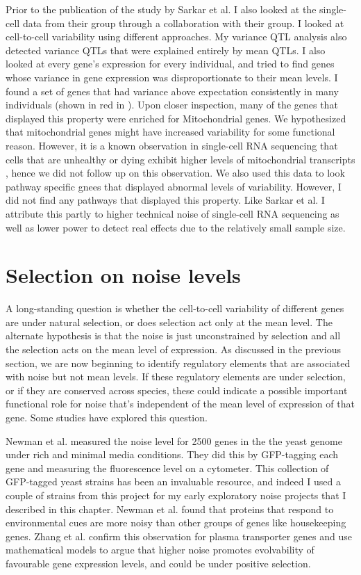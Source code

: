 Prior to the publication of the study by Sarkar et al. I also looked at the single-cell data from their group through a collaboration with their group. I looked at cell-to-cell variability using different approaches. My variance QTL analysis also detected variance QTLs that were explained entirely by mean QTLs. I also looked at every gene's expression for every individual, and tried to find genes whose variance in gene expression was disproportionate to their mean levels. I found a set of genes that had variance above expectation consistently in many individuals (shown in red in \cite{fig:intro_figure1}). Upon closer inspection, many of the genes that displayed this property were enriched for Mitochondrial genes. We hypothesized that mitochondrial genes might have increased variability for some functional reason. However, it is a known observation in single-cell RNA sequencing that cells that are unhealthy or dying exhibit higher levels of mitochondrial transcripts \cite {seurat}, hence we did not follow up on this observation. We also used this data to look pathway specific gnees that displayed abnormal levels of variability. However, I did not find any pathways that displayed this property. Like Sarkar et al. I attribute this partly to higher technical noise of single-cell RNA sequencing as well as lower power to detect real effects due to the relatively small sample size.

 


\section{Selection on noise levels}

A long-standing question is whether the cell-to-cell variability of different genes are under natural selection, or does selection act only at the mean level. The alternate hypothesis is that the noise is just unconstrained by selection and all the selection acts on the mean level of expression. As discussed in the previous section, we are now beginning to identify regulatory elements that are associated with noise but not mean levels. If these regulatory elements are under selection, or if they are conserved across species, these could indicate a possible important functional role for noise that's independent of the mean level of expression of that gene. Some studies have explored this question.

Newman et al. \cite{Newman} measured the noise level for 2500 genes in the the yeast genome under rich and minimal media conditions. They did this by GFP-tagging each gene and measuring the fluorescence level on a cytometer. This collection of GFP-tagged yeast strains has been an invaluable resource, and indeed I used a couple of strains from this project for my early exploratory noise projects that I described in this chapter. Newman et al. found that proteins that respond to environmental cues are more noisy than other groups of genes like housekeeping genes. Zhang et al. \cite{Zhang} confirm this observation for plasma transporter genes and use mathematical models to argue that higher noise promotes evolvability of favourable gene expression levels, and could be under positive selection. 

